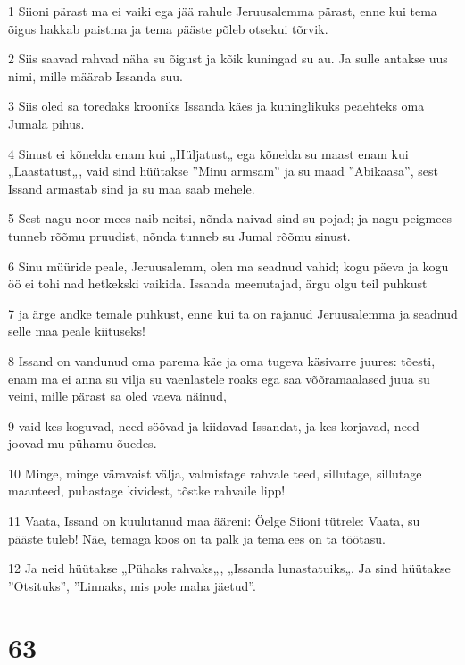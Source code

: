 \par 1 Siioni pärast ma ei vaiki ega jää rahule Jeruusalemma pärast, enne kui tema õigus hakkab paistma ja tema pääste põleb otsekui tõrvik.
\par 2 Siis saavad rahvad näha su õigust ja kõik kuningad su au. Ja sulle antakse uus nimi, mille määrab Issanda suu.
\par 3 Siis oled sa toredaks krooniks Issanda käes ja kuninglikuks peaehteks oma Jumala pihus.
\par 4 Sinust ei kõnelda enam kui „Hüljatust„ ega kõnelda su maast enam kui „Laastatust„, vaid sind hüütakse ”Minu armsam” ja su maad ”Abikaasa”, sest Issand armastab sind ja su maa saab mehele.
\par 5 Sest nagu noor mees naib neitsi, nõnda naivad sind su pojad; ja nagu peigmees tunneb rõõmu pruudist, nõnda tunneb su Jumal rõõmu sinust.
\par 6 Sinu müüride peale, Jeruusalemm, olen ma seadnud vahid; kogu päeva ja kogu öö ei tohi nad hetkekski vaikida. Issanda meenutajad, ärgu olgu teil puhkust
\par 7 ja ärge andke temale puhkust, enne kui ta on rajanud Jeruusalemma ja seadnud selle maa peale kiituseks!
\par 8 Issand on vandunud oma parema käe ja oma tugeva käsivarre juures: tõesti, enam ma ei anna su vilja su vaenlastele roaks ega saa võõramaalased juua su veini, mille pärast sa oled vaeva näinud,
\par 9 vaid kes koguvad, need söövad ja kiidavad Issandat, ja kes korjavad, need joovad mu pühamu õuedes.
\par 10 Minge, minge väravaist välja, valmistage rahvale teed, sillutage, sillutage maanteed, puhastage kividest, tõstke rahvaile lipp!
\par 11 Vaata, Issand on kuulutanud maa ääreni: Öelge Siioni tütrele: Vaata, su pääste tuleb! Näe, temaga koos on ta palk ja tema ees on ta töötasu.
\par 12 Ja neid hüütakse „Pühaks rahvaks„, „Issanda lunastatuiks„. Ja sind hüütakse ”Otsituks”, ”Linnaks, mis pole maha jäetud”.

\chapter{63}

